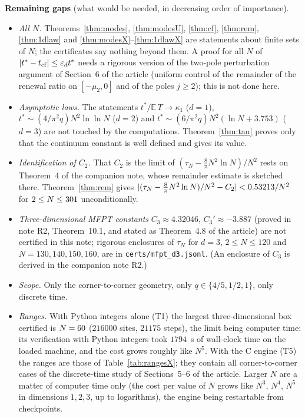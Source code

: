 \documentclass[11pt,a4paper]{article}
\theoremstyle{definition}
\theoremstyle{remark}
\begin{document}
\textbf{Remaining gaps} (what would be needed, in decreasing order of importance).
\begin{itemize}
\item[G1.] \emph{All $N$.} Theorems~\ref{thm:modes}, \ref{thm:modesU}, \ref{thm:cf}, \ref{thm:rem}, \ref{thm:1dlaw} and \ref{thm:modesX}--\ref{thm:1dlawX} are statements about finite sets of $N$; the certificates say nothing beyond them. A proof for all $N$ of $|t^*-t_{\rm cf}|\le\varepsilon_dt^*$ needs a rigorous version of the two-pole perturbation argument of Section~6 of the article (uniform control of the remainder of the renewal ratio on $[-\mu_2,0]$ and of the poles $j\ge2$); this is not done here.
\item[G2.] \emph{Asymptotic laws.} The statements $t^*/\mathbb E\,T\to\kappa_1$ ($d=1$), $t^*\sim(4/\pi^2q)N^2\ln\ln N$ ($d=2$) and $t^*\sim(6/\pi^2q)N^2(\ln N+3.753)$ ($d=3$) are not touched by the computations. Theorem~\ref{thm:tau} proves only that the continuum constant is well defined and gives its value.
\item[G3.] \emph{Identification of $C_2$.} That $C_2$ is the limit of $(\tau_N-\frac8\pi N^2\ln N)/N^2$ rests on Theorem~4 of the companion note, whose remainder estimate is sketched there. Theorem~\ref{thm:rem} gives $|(\tau_N-\frac8\pi N^2\ln N)/N^2-C_2|<0.53213/N^2$ for $2\le N\le301$ unconditionally.
\item[G4.] \emph{Three-dimensional MFPT constants} $C_3\approx4.32046$, $C_3'\approx-3.887$ (proved in note R2, Theorem~10.1, and stated as Theorem~4.8 of the article) are not certified in this note; rigorous enclosures of $\tau_N$ for $d=3$, $2\le N\le120$ and $N=130,140,150,160$, are in \texttt{certs/mfpt\_d3.jsonl}. (An enclosure of $C_3$ is derived in the companion note R2.)
\item[G5.] \emph{Scope.} Only the corner-to-corner geometry, only $q\in\{4/5,1/2,1\}$, only discrete time.
\item[G6.] \emph{Ranges.} With Python integers alone (T1) the largest three-dimensional box certified is $N=60$ ($216000$ sites, $21175$ steps), the limit being computer time: its verification with Python integers took $1794$~s of wall-clock time on the loaded machine, and the cost grows roughly like $N^5$.
With the C engine (T5) the ranges are those of Table~\ref{tab:rangesX}; they contain all corner-to-corner cases of the discrete-time study of Sections~5--6 of the article. Larger $N$ are a matter of computer time only (the cost per value of $N$ grows like $N^{3}$, $N^{4}$, $N^{5}$ in dimensions $1,2,3$, up to logarithms), the engine being restartable from checkpoints.

\end{itemize}
\end{document}
